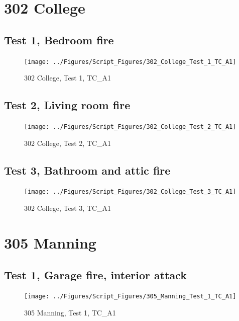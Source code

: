 \documentclass[11pt,oneside]{book}
\begin{document}
\section{302 College}

\subsection{Test 1, Bedroom fire}

\begin{figure}[!ht]
\texttt{[image: ../Figures/Script\_Figures/302\_College\_Test\_1\_TC\_A1]}
\caption{302 College, Test 1, TC\_A1}
\label{fig:302_College_Test_1_TC_A1}
\end{figure}

\subsection{Test 2, Living room fire}

\begin{figure}[!ht]
\texttt{[image: ../Figures/Script\_Figures/302\_College\_Test\_2\_TC\_A1]}
\caption{302 College, Test 2, TC\_A1}
\label{fig:302_College_Test_2_TC_A1}
\end{figure}

\subsection{Test 3, Bathroom and attic fire}

\begin{figure}[!ht]
\texttt{[image: ../Figures/Script\_Figures/302\_College\_Test\_3\_TC\_A1]}
\caption{302 College, Test 3, TC\_A1}
\label{fig:302_College_Test_3_TC_A1}
\end{figure}

\clearpage


\section{305 Manning}

\subsection{Test 1, Garage fire, interior attack}

\begin{figure}[!ht]
\texttt{[image: ../Figures/Script\_Figures/305\_Manning\_Test\_1\_TC\_A1]}
\caption{305 Manning, Test 1, TC\_A1}
\label{fig:305_Manning_Test_1_TC_A1}
\end{figure}
\end{document}

